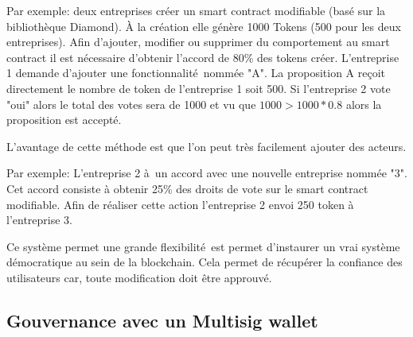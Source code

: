 Par exemple: deux entreprises créer un smart contract modifiable (basé sur la bibliothèque Diamond). À la création
elle génère 1000 Tokens (500 pour les deux entreprises). Afin d'ajouter, modifier ou supprimer 
du comportement au smart contract il est nécessaire d'obtenir l'accord de 80\% des tokens créer. 
L'entreprise 1 demande d'ajouter une fonctionnalité nommée "A". La proposition A reçoit directement le nombre de token
de l'entreprise 1 soit 500. Si l'entreprise 2 vote "oui" alors le total des votes sera de 1000 et vu que $1000 > 1000*0.8$
alors la proposition est accepté.

L'avantage de cette méthode est que l'on peut très facilement ajouter des acteurs.

Par exemple: L'entreprise 2 à un accord avec une nouvelle entreprise nommée "3". Cet accord consiste à obtenir
25\% des droits de vote sur le smart contract modifiable. Afin de réaliser cette action l'entreprise 2 envoi 250
token à l'entreprise 3.


Ce système permet une grande flexibilité est permet d'instaurer un vrai système démocratique au sein de la blockchain.
Cela permet de récupérer la confiance des utilisateurs car, toute modification doit être approuvé.

\subsection{Gouvernance avec un Multisig wallet}

